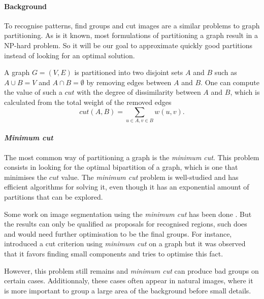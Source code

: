 \paragraph{Background}
To recognise patterns, find groups and cut images are a similar problems to graph partitioning.
As is it known, most formulations of partitioning a graph result in a NP-hard problem.
So it will be our goal to approximate quickly good partitions instead of looking for an optimal solution.

A graph \(G = (V, E)\) is partitioned into two disjoint sets \(A\) and \(B\) such as \(A \cup B = V\) and \(A \cap B = \emptyset\) by removing edges between \(A\) and \(B\).
One can compute the value of such a \(cut\) with the degree of dissimilarity between \(A\) and \(B\), which is calculated from the total weight of the removed edges
\[cut(A, B) = \sum_{u\in A, v\in B} w(u, v).\]

\paragraph{\textit{Minimum cut}}
The most common way of partitioning a graph is the \textit{minimum cut}.
This problem consists in looking for the optimal bipartition of a graph, which is one that minimises the \(cut\) value.
The \textit{minimum cut} problem is well-studied and has efficient algorithms for solving it, even though it has an exponential amount of partitions that can be explored.

Some work on image segmentation using the \textit{minimum cut} has been done \cite{wu_optimal_1993} \cite{estrada_spectral_2004} \cite{felzenszwalb_efficient_2004}.
But the results can only be qualified as proposals for recognised regions, such does \cite{estrada_spectral_2004} and would need further optimisation to be the final groups.
For instance, \cite{wu_optimal_1993} introduced a cut criterion using \textit{minimum cut} on a graph but it was observed that it favors finding small components and \cite{felzenszwalb_efficient_2004} tries to optimise this fact.

However, this problem still remains and \textit{minimum cut} can produce bad groups on certain cases.
Additionnaly, these cases often appear in natural images, where it is more important to group a large area of the background before small details.

